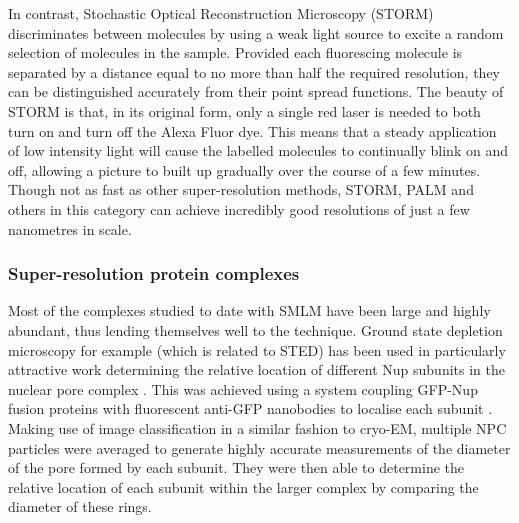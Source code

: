 \documentclass[a4paper,11pt,twoside,openright]{scrbook}
\begin{document}
In contrast, Stochastic Optical Reconstruction Microscopy \cite{Rust2006} (STORM) discriminates between molecules by using a weak light source to excite a random selection of molecules in the sample. Provided each fluorescing molecule is separated by a distance equal to no more than half the required resolution, they can be distinguished accurately from their point spread functions. The beauty of STORM is that, in its original form, only a single red laser is needed to both turn on and turn off the Alexa Fluor dye. This means that a steady application of low intensity light will cause the labelled molecules to continually blink on and off, allowing a picture to built up gradually over the course of a few minutes. Though not as fast as other super-resolution methods, STORM, PALM and others in this category can achieve incredibly good resolutions of just a few nanometres in scale.

\subsubsection{Super-resolution protein complexes}
Most of the complexes studied to date with SMLM have been large and highly abundant, thus lending themselves well to the technique. Ground state depletion microscopy for example (which is related to STED) has been used in particularly attractive work determining the relative location of different Nup subunits in the nuclear pore complex \cite{Szymborska2013}. This was achieved using a system coupling GFP-Nup fusion proteins with fluorescent anti-GFP nanobodies to localise each subunit \cite{Ries2012}. Making use of image classification in a similar fashion to cryo-EM, multiple NPC particles were averaged to generate highly accurate measurements of the diameter of the pore formed by each subunit. They were then able to determine the relative location of each subunit within the larger complex by comparing the diameter of these rings.
\end{document}
